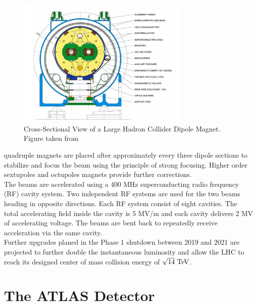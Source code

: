 \begin{figure}[h!]
\centering
\includegraphics[width=0.75\textwidth]{figures/LHC_ATLAS/LHCCrossSection.pdf}
\caption{ Cross-Sectional View of a Large Hadron Collider Dipole Magnet. Figure taken from \cite{LHC} }
 \label{LHC_Xsec}
\end{figure}

 quadruple magnets are placed after approximately every three dipole sections to stabilize and focus the beam using the principle of strong focusing.  Higher order sextupoles and octupoles magnets provide further corrections. \\

\indent The beams are accelerated using a 400 MHz superconducting radio frequency (RF) cavity system.  Two independent RF systems are used for the two beams heading in opposite directions.  Each RF system consist of eight cavities.  The total accelerating field inside the cavity is 5 MV/m and each cavity delivers 2 MV of accelerating voltage.  The beams are bent back to repeatedly receive acceleration via the same cavity.  \\

\indent Further upgrades planed in the Phase 1 shutdown between 2019 and 2021 are projected to further double the instantaneous luminosity and allow the LHC to reach its designed center of mass collision energy of $\sqrt{14} \tev$. \cite{Phase1} \\

\section{The ATLAS Detector}
\label{LHC:detector}

